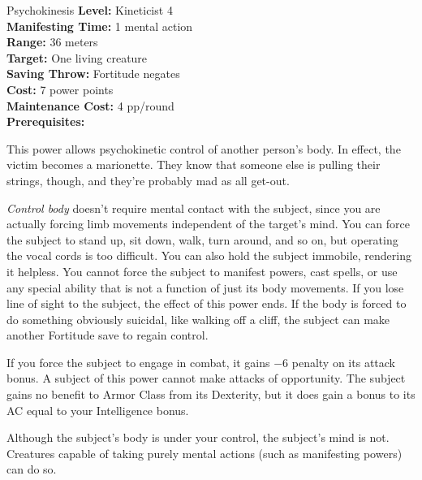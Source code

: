 {Psychokinesis}
{
	\textbf{Level:}
	Kineticist 4\\
	\textbf{Manifesting Time:}
	1 mental action\\
	\textbf{Range:}
	36 meters\\
	\textbf{Target:}
	One living creature\\
	\textbf{Saving Throw:}
	Fortitude negates\\
	\textbf{Cost:}
	7 power points\\
	\textbf{Maintenance Cost:}
	4 pp/round\\
	\textbf{Prerequisites:}
	\\
}
{
	This power allows psychokinetic control of another person's body. In effect, the victim becomes a marionette. They know that someone else is pulling their strings, though, and they're probably mad as all get-out.

	\emph{Control body} doesn't require mental contact with the subject, since you are actually forcing limb movements independent of the target's mind. You can force the subject to stand up, sit down, walk, turn around, and so on, but operating the vocal cords is too difficult. You can also hold the subject immobile, rendering it helpless. You cannot force the subject to manifest powers, cast spells, or use any special ability that is not a function of just its body movements. If you lose line of sight to the subject, the effect of this power ends. If the body is forced to do something obviously suicidal, like walking off a cliff, the subject can make another Fortitude save to regain control.

	If you force the subject to engage in combat, it gains $-6$ penalty on its attack bonus. A subject of this power cannot make attacks of opportunity. The subject gains no benefit to Armor Class from its Dexterity, but it does gain a bonus to its AC equal to your Intelligence bonus.

	Although the subject's body is under your control, the subject’s mind is not. Creatures capable of taking purely mental actions (such as manifesting powers) can do so.
}